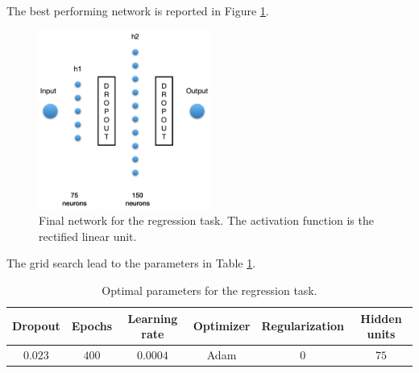 The best performing network is reported in Figure \ref{fig:reg_net}.
\begin{figure}[h]
    \centering
    \includegraphics[width=0.5\textwidth]{Images/Regression_network.png}
    \caption{Final network for the regression task. The activation function is the rectified linear unit.}
    \label{fig:reg_net}
\end{figure}
The grid search lead to the parameters in Table \ref{tab:reg_par}.
\begin{table}[h]
    \centering
    \begin{tabular}{cccccc} \hline
        Dropout & Epochs & Learning rate & Optimizer & Regularization & Hidden units \\ \hline
        $0.023$ & $400$  & $0.0004$      & Adam      & $0$            & $75$
    \end{tabular}
    \caption{Optimal parameters for the regression task.}
    \label{tab:reg_par}
\end{table}

